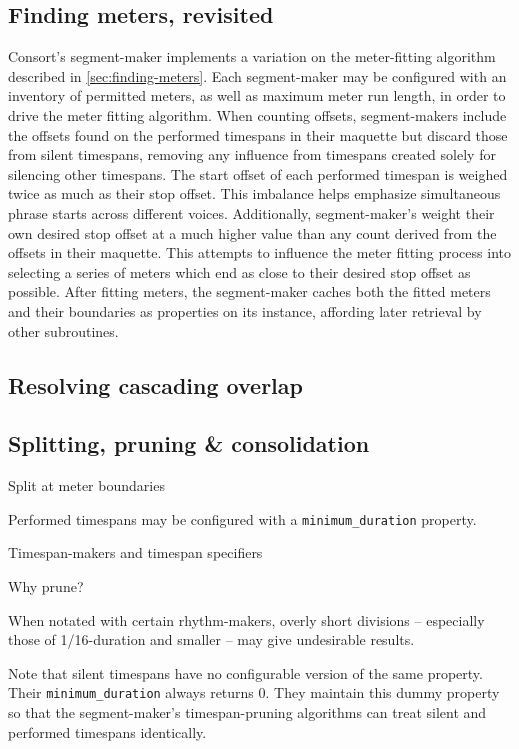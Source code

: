 \subsection{Finding meters, revisited}
\label{ssec:finding-meters-revisited}

Consort's segment-maker implements a variation on the meter-fitting algorithm
described in \autoref{sec:finding-meters}. Each segment-maker may be configured
with an inventory of permitted meters, as well as maximum meter run length, in
order to drive the meter fitting algorithm. When counting offsets,
segment-makers include the offsets found on the performed timespans in their
maquette but discard those from silent timespans, removing any influence from
timespans created solely for silencing other timespans. The start offset of
each performed timespan is weighed twice as much as their stop offset. This
imbalance helps emphasize simultaneous phrase starts across different voices.
Additionally, segment-maker's weight their own desired stop offset at a much
higher value than any count derived from the offsets in their maquette. This
attempts to influence the meter fitting process into selecting a series of
meters which end as close to their desired stop offset as possible. After
fitting meters, the segment-maker caches both the fitted meters and their
boundaries as properties on its instance, affording later retrieval by other
subroutines.

\subsection{Resolving cascading overlap}
\label{ssec:resolving-cascading-overlap}

\subsection{Splitting, pruning \& consolidation}
\label{ssec:splitting-pruning-and-consolidation}

Split at meter boundaries

Performed timespans may be configured with a \texttt{minimum\_duration}
property.

Timespan-makers and timespan specifiers

Why prune?

When notated with certain rhythm-makers, overly short divisions -- especially
those of 1/16-duration and smaller -- may give undesirable results.

Note that silent timespans have no configurable version of the same property.
Their \texttt{minimum\_duration} always returns 0. They maintain this dummy
property so that the segment-maker's timespan-pruning algorithms can treat
silent and performed timespans identically.

